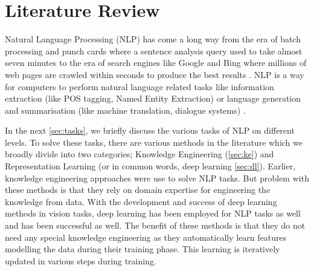 \section{Literature Review}\label{sec:lit_rev}
Natural Language Processing (NLP) has come a long way from the era of batch processing and punch cards where a sentence analysis query used to take almost seven minutes to the era of search engines like Google and Bing where millions of web pages are crawled within seconds to produce the best results \cite{Cambria2014}. NLP is a way for computers to perform natural language related tasks like information extraction (like POS tagging, Named Entity Extraction) or language generation and summarisation (like machine translation, dialogue systems) \cite{Young2018}.

In the next \cref{sec:tasks}, we briefly discuss the various tasks of NLP on different levels. To solve these tasks, there are various methods in the literature which we broadly divide into two categories; Knowledge Engineering (\cref{sec:ke}) and Representation Learning (or in common words, deep learning \cref{sec:dl}). Earlier, knowledge engineering approaches were use to solve NLP tasks. But problem with these methods is that they rely on domain expertise for engineering the knowledge from data. With the development and success of deep learning methods in vision tasks, deep learning has been employed for NLP tasks as well and has been successful as well. The benefit of these methods is that they do not need any special knowledge engineering as they automatically learn features modelling the data during their training phase. This learning is iteratively updated in various steps during training.



